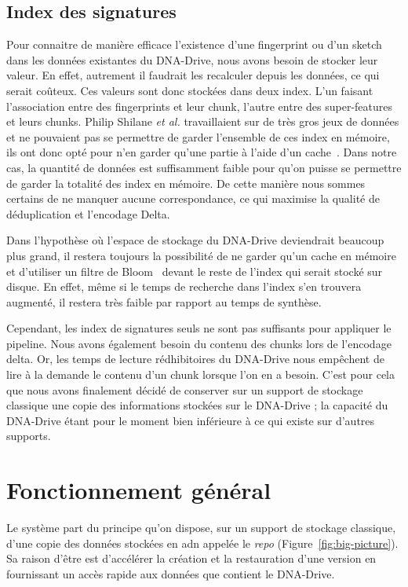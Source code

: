 \documentclass[a4paper]{report}
\makeatletter
\newcommand{\etal}{\emph{et al.}\@\xspace}
\makeatother
\begin{document}
\subsection{Index des signatures}
Pour connaitre de manière efficace l'existence d'une fingerprint
ou d'un sketch dans les données existantes du DNA-Drive, nous avons besoin de stocker leur valeur.
En effet, autrement il faudrait les recalculer depuis les données, ce qui serait coûteux.
Ces valeurs sont donc stockées dans deux index.
L'un faisant l'association entre des fingerprints et leur chunk,
l'autre entre des super-features et leurs chunks.
Philip Shilane \etal travaillaient sur de très gros jeux de données
et ne pouvaient pas se permettre de garder l'ensemble de ces index en mémoire,
ils ont donc opté pour n'en garder qu'une partie à l'aide d'un cache~\cite{shilane2012wan}.
Dans notre cas, la quantité de données est suffisamment faible pour qu'on puisse se permettre
de garder la totalité des index en mémoire.
De cette manière nous sommes certains de ne manquer aucune correspondance,
ce qui maximise la qualité de déduplication et l'encodage Delta.

Dans l'hypothèse où l'espace de stockage du DNA-Drive deviendrait beaucoup plus grand,
il restera toujours la possibilité de ne garder qu'un cache en mémoire
et d'utiliser un filtre de Bloom~\cite{bloom1970space} devant le reste de l'index
qui serait stocké sur disque.
En effet, même si le temps de recherche dans l'index s'en trouvera augmenté,
il restera très faible par rapport au temps de synthèse.

Cependant, les index de signatures seuls ne sont pas suffisants pour appliquer le pipeline.
Nous avons également besoin du contenu des chunks lors de l'encodage delta.
Or, les temps de lecture rédhibitoires du DNA-Drive nous empêchent de lire à la demande
le contenu d'un chunk lorsque l'on en a besoin.
C'est pour cela que nous avons finalement décidé de conserver sur un support de stockage classique
une copie des informations stockées sur le DNA-Drive ;
la capacité du DNA-Drive étant pour le moment bien inférieure à ce qui existe sur d'autres supports.


\section{Fonctionnement général}

Le système part du principe qu'on dispose, sur un support de stockage classique,
d'une copie des données stockées en \ac{adn} appelée le \emph{repo} (Figure~\ref{fig:big-picture}).
Sa raison d'être est d'accélérer la création et la restauration d'une version
en fournissant un accès rapide aux données que contient le DNA-Drive.
\end{document}
